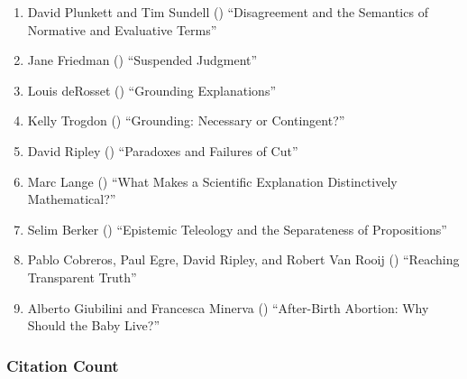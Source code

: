 \documentclass[
  10pt,
  letterpaper,
  DIV=11,
  numbers=noendperiod,
  twoside]{scrartcl}
\providecommand{\tightlist}{%
  \setlength{\itemsep}{0pt}\setlength{\parskip}{0pt}}\usepackage{longtable,booktabs,array}
\begin{document}
\begin{enumerate}
\def\labelenumi{\arabic{enumi}.}
\tightlist
\item
  David Plunkett and Tim Sundell
  () ``Disagreement and the
  Semantics of Normative and Evaluative Terms''
\item
  Jane Friedman () ``Suspended
  Judgment''
\item
  Louis deRosset () ``Grounding
  Explanations''
\item
  Kelly Trogdon () ``Grounding:
  Necessary or Contingent?''
\item
  David Ripley () ``Paradoxes and
  Failures of Cut''
\item
  Marc Lange () ``What Makes a
  Scientific Explanation Distinctively Mathematical?''
\item
  Selim Berker () ``Epistemic
  Teleology and the Separateness of Propositions''
\item
  Pablo Cobreros, Paul Egre, David Ripley, and Robert Van Rooij
  () ``Reaching Transparent
  Truth''
\item
  Alberto Giubilini and Francesca Minerva
  () ``After-Birth Abortion: Why
  Should the Baby Live?''
\end{enumerate}

\subsubsection*{Citation Count}\label{sec-count-2013}
\end{document}
